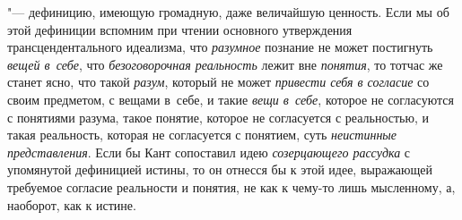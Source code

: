 "--- дефиницию, имеющую громадную, даже величайшую ценность.
Если мы об этой дефиниции вспомним при чтении основного утверждения
трансцендентального идеализма, что
{\em разумное} познание
не может постигнуть {\em вещей в~себе},
что {\em безоговорочная
реальность} лежит вне
{\em понятия}, то тотчас
же станет ясно, что такой {\em разум},
который не может
{\em привести себя в согласие}
со своим предметом, с вещами в~себе, и такие
{\em вещи в~себе},
которое не согласуются с понятиями разума, такое понятие,
которое не согласуется с реальностью, и такая реальность, которая не
согласуется с понятием, суть
{\em неистинные представления}.
Если бы Кант сопоставил идею
{\em созерцающего рассудка}
с упомянутой дефиницией истины, то он отнесся бы к этой идее,
выражающей требуемое согласие реальности и понятия, не как к чему-то лишь
мысленному, а, наоборот, как к истине.


